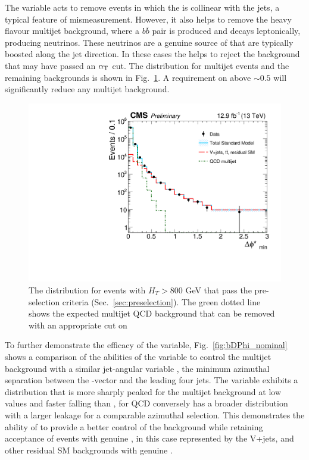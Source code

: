 The \bdphi variable acts to remove events in which the \MET is
collinear with the jets, a typical feature of mismeasurement. However,
it also helps to remove the heavy flavour \QCD multijet background,
where a $b\bar{b}$ pair is produced and decays leptonically, producing
neutrinos. These neutrinos are a genuine source of \MET that are
typically boosted along the jet direction. In these cases the \bdphi
helps to reject the \QCD background that may have passed an $\alpha_{\text{T}}$
cut. The \bdphi distribution for multijet events and the remaining \SM
backgrounds is shown in Fig.~\ref{fig:bdphi}. A requirement on \bdphi
above $\sim 0.5$ will significantly reduce any \QCD multijet background.

\begin{figure}
	\begin{center}
		\includegraphics[width=0.7\linewidth]{figs/analysis/eventSelection/CMS-PAS-SUS-16-016_Figure-aux_002}%
	\end{center}
  \caption{The \bdphi distribution for events with $H_T>800$ GeV that
  pass the pre-selection criteria (Sec.~\ref{sec:preselection}). The
  green dotted line shows the expected multijet QCD background that
  can be removed with an appropriate cut on \bdphi}
	\label{fig:bdphi}
\end{figure}


To further demonstrate the efficacy of the \bdphi variable,
Fig.~\ref{fig:bDPhi_nominal} shows a comparison of the abilities of
the \bdphi variable to control the \QCD multijet background with a
similar jet-\mht angular variable \dphimhtj, the minimum azimuthal
separation between the \mht-vector and the leading four jets. The
\bdphi variable exhibits a distribution that is more sharply peaked
for the \QCD multijet background at low values and faster falling than
\dphimhtj,  \dphimhtj for QCD conversely has a broader distribution
with a larger leakage for a comparable azimuthal selection. This
demonstrates the ability of \bdphi to provide a better control of the
\QCD background while retaining acceptance of events with genuine
\mht, in this case represented by the V+jets, \ttbar and other
residual SM backgrounds with genuine \met. 

